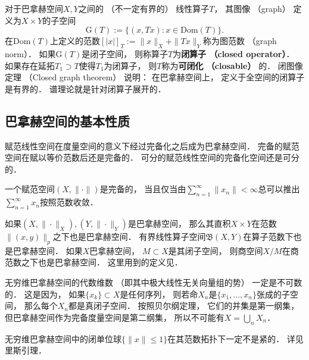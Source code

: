 对于巴拿赫空间$X,Y$之间的 （不一定有界的） 线性算子$T$， 其图像 （graph） 定义为$X\times Y$的子空间
$$
\text{G}(T):=\{(x,Tx):x\in \text{Dom}(T)\}.
$$
在$\text{Dom}(T)$上定义的范数$[|x|]_T:=\|x\|_X+\|Tx\|_Y$称为图范数 （graph norm）． 如果$\text{G}(T)$是闭子空间， 则称算子$T$为\textbf{闭算子 （closed operator）}． 如果存在延拓$T_1\supset T$使得$T_1$为闭算子， 则$T$称为\textbf{可闭化 （closable）} 的． 闭图像定理 （Closed graph theorem） 说明： 在巴拿赫空间上， 定义于全空间的闭算子是有界的． 谱理论就是针对闭算子展开的．

\subsection{巴拿赫空间的基本性质}
赋范线性空间在度量空间的意义下经过完备化之后成为巴拿赫空间． 完备的赋范空间在赋以等价范数后还是完备的． 可分的赋范线性空间的完备化空间还是可分的． 

一个赋范空间$(X,\|\cdot\|)$是完备的， 当且仅当由$\sum _{n=1}^{\infty }\|x_{n}\|<\infty $总可以推出$\sum _{n=1}^{\infty }x_{n}$按照范数收敛．

如果$(X,\|\cdot\|_X),(Y,\|\cdot\|_Y)$是巴拿赫空间， 那么其直积$X\times Y$在范数$\|(x,y)\|_{p}$之下也是巴拿赫空间． 有界线性算子空间$\mathfrak{B}(X,Y)$在算子范数下也是巴拿赫空间． 如果$X$巴拿赫空间， $M\subset X$是其闭子空间， 则商空间$X/M$在商范数之下也是巴拿赫空间． 这里用到的定义见．

无穷维巴拿赫空间的代数维数 （即其中极大线性无关向量组的势） 一定是不可数的． 这是因为， 如果$\{x_k\}\subset X$是任何序列， 则若命$X_n$是$\{x_1,...,x_n\}$张成的子空间， 那么每个$X_n$都是真闭子空间． 按照贝尔纲定理， 它们的并集是第一纲集， 但巴拿赫空间作为完备度量空间是第二纲集， 所以不可能有$X=\bigcup_n X_n$．

无穷维巴拿赫空间中的闭单位球$\{\|x\|\leq1\}$在其范数拓扑下一定不是紧的． 详见里斯引理．